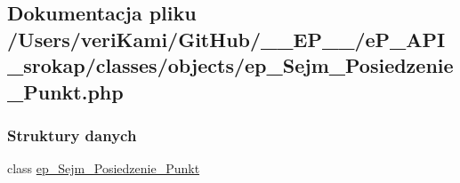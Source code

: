 \hypertarget{ep___sejm___posiedzenie___punkt_8php}{\subsection{Dokumentacja pliku /\-Users/veri\-Kami/\-Git\-Hub/\-\_\-\-\_\-\-E\-P\-\_\-\-\_\-/e\-P\-\_\-\-A\-P\-I\-\_\-srokap/classes/objects/ep\-\_\-\-Sejm\-\_\-\-Posiedzenie\-\_\-\-Punkt.php}
\label{ep___sejm___posiedzenie___punkt_8php}
}
\subsubsection*{Struktury danych}
\begin{DoxyCompactItemize}
\item 
class \hyperlink{classep___sejm___posiedzenie___punkt}{ep\-\_\-\-Sejm\-\_\-\-Posiedzenie\-\_\-\-Punkt}
\end{DoxyCompactItemize}
